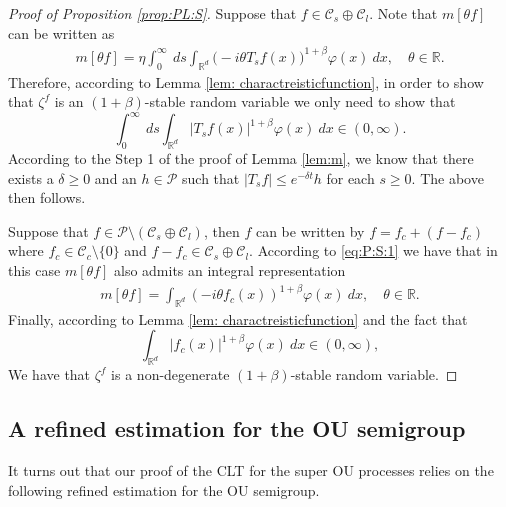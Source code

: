 \documentclass[12pt,a4paper]{amsart}
\theoremstyle{plain}
\theoremstyle{definition}
\numberwithin{equation}{section}
\begin{document}
\begin{proof}[Proof of Proposition \ref{prop:PL:S}]
	Suppose that $f\in \mathcal C_s \oplus \mathcal C_l$.
Note that $m[\theta f]$ can be written as
  \begin{align}
    \label{eq:PL:S:1}
    m[\theta f]
    = \eta \int_0^{\infty}~ds\int_{\mathbb R^d} \big(-i\theta T_s f(x)\big)^{1+\beta} \varphi(x)~dx,
    \quad \theta \in \mathbb R.
  \end{align}
	Therefore, according to Lemma \ref{lem: charactreisticfunction}, in order to show that $\zeta^f$ is an $(1+\beta)$-stable random variable we only need to show that
\[    
\int_0^{\infty}~ds\int_{\mathbb R^d} | T_{s} f(x)|^{1+\beta} \varphi(x)~dx
    \in (0, \infty).
    \]
  According to the Step 1 of the proof of Lemma \ref{lem:m}, we know that there exists a $\delta \geq 0$ and an $h \in \mathcal P$ such that $|T_sf| \leq e^{- \delta t} h$ for each $s\geq 0$.
  The above then follows.
  
  Suppose that $f \in \mathcal P \setminus (\mathcal C_s \oplus \mathcal C_l)$, then $f$ can be written by $f = f_c +(f - f_c)$ where $f_c \in \mathcal C_c\setminus\{0\}$ and $f - f_c \in \mathcal C_s \oplus \mathcal C_l$.
  According to \eqref{eq:P:S:1} we have that in this case $m[\theta f]$ also admits an integral representation
  \begin{align}
  \label{eq:PL:S:2}
  m[\theta f] 
  = \int_{\mathbb R^d} (-i\theta f_c(x))^{1+\beta} \varphi(x) ~dx,
  \quad \theta \in \mathbb R.
  \end{align}
  Finally, according to Lemma \ref{lem: charactreisticfunction} and the fact that
  \begin{equation}
    \int_{\mathbb R^d} | f_c(x)|^{1+\beta} \varphi(x)~dx
    \in (0, \infty),
  \end{equation}
We have that $\zeta^f$ is a non-degenerate $(1+\beta)$-stable random variable.
\end{proof}

\subsection{A refined estimation for the OU semigroup}
It turns out that our proof of the CLT for the super OU processes relies on the following refined estimation for the OU semigroup.
\end{document}
